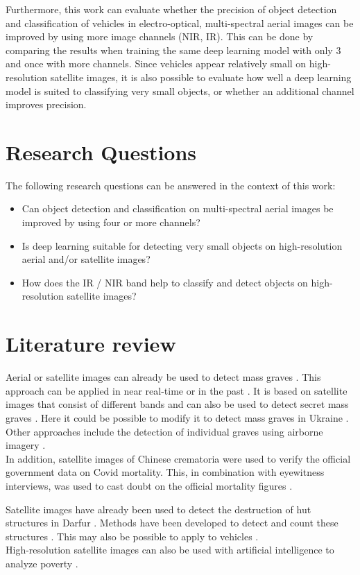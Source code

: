 \documentclass[a4paper,11pt,pdftex, parskip]{scrreprt}
\begin{document}
    Furthermore, this work can evaluate whether the precision of object detection and classification of vehicles in electro-optical, multi-spectral aerial images can be improved by using more image channels (NIR, IR). This can be done by comparing the results when training the same deep learning model with only 3 and once with more channels. Since vehicles appear relatively small on high-resolution satellite images, it is also possible to evaluate how well a deep learning model is suited to classifying very small objects, or whether an additional channel improves precision.


    \section*{Research Questions}
The following research questions can be answered in the context of this work:
\begin{itemize}
  \item Can object detection and classification on multi-spectral aerial images be improved by using four or more channels?
  \item Is deep learning suitable for detecting very small objects on high-resolution aerial and/or satellite images?
  \item How does the IR / NIR band help to classify and detect objects on high-resolution satellite images?
\end{itemize}

\section*{Literature review}
Aerial or satellite images can already be used to detect mass graves \cite{Kalacska2006}. This approach can be applied in near real-time or in the past \cite{Kalacska2006}. It is based on satellite images that consist of different bands and can also be used to detect secret mass graves \cite{Kalacska2006}. Here it could  be possible to modify it to detect mass graves in Ukraine \cite{Kalacska2006}. \\
Other approaches include the detection of individual graves using airborne imagery \cite{Leblanc2014}. \\
In addition, satellite images of Chinese crematoria were used to verify the official government data on Covid mortality. This, in combination with eyewitness interviews, was used to cast doubt on the official mortality figures \cite{Spiegel_article}. 

Satellite images have already been used to detect the destruction of hut structures in Darfur \cite{Knoth2017}. Methods have been developed to detect and count these structures \cite{Kemper2011}. This may also be possible to apply to vehicles \cite{Kemper2011}. \\
High-resolution satellite images can also be used with artificial intelligence to analyze poverty \cite{Hall2023}. \\
\end{document}
